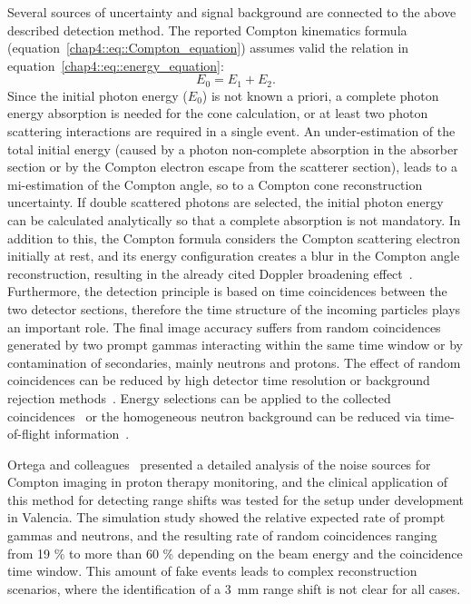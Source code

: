 Several sources of uncertainty and signal background are connected to the above described detection method. The reported Compton kinematics formula (equation~\ref{chap4::eq::Compton_equation}) assumes valid the relation in equation~\ref{chap4::eq::energy_equation}:
 \begin{equation}
E_{0} = E_{1}+E_{2}.
\label{chap4::eq::energy_equation}
\end{equation} 
Since the initial photon energy (\(E_{0}\)) is not known a priori, a complete photon energy absorption is needed for the cone calculation, or at least two photon scattering interactions are required in a single event. An under-estimation of the total initial energy (caused by a photon non-complete absorption in the absorber section or by the Compton electron escape from the scatterer section), leads to a mi-estimation of the Compton angle, so to a Compton cone reconstruction uncertainty. If double scattered photons are selected, the initial photon energy can be calculated analytically so that a complete absorption is not mandatory. In addition to this, the Compton formula considers the Compton scattering electron initially at rest, and its energy configuration creates a blur in the Compton angle reconstruction, resulting in the already cited Doppler broadening effect~\parencite{Ordonez1997}. Furthermore, the detection principle is based on time coincidences between the two detector sections, therefore the time structure of the incoming particles plays an important role. The final image accuracy suffers from random coincidences generated by two prompt gammas interacting within the same time window or by contamination of secondaries, mainly neutrons and protons. The effect of random coincidences can be reduced by high detector time resolution or background rejection methods~\parencite{Draeger2017}. Energy selections can be applied to the collected coincidences~\parencite{Polf2009, Hilaire2016} or the homogeneous neutron background can be reduced via time-of-flight information~\parencite{Testa2010}.

Ortega and colleagues~\parencite{Ortega2015} presented a detailed analysis of the noise sources for Compton imaging in proton therapy monitoring, and the clinical application of this method for detecting range shifts was tested for the setup under development in Valencia. The simulation study showed the relative expected rate of prompt gammas and neutrons, and the resulting rate of random coincidences ranging from 19 \% to more than 60 \% depending on the beam energy and the coincidence time window. This amount of fake events leads to complex reconstruction scenarios, where the identification of a 3~mm range shift is not clear for all cases.

